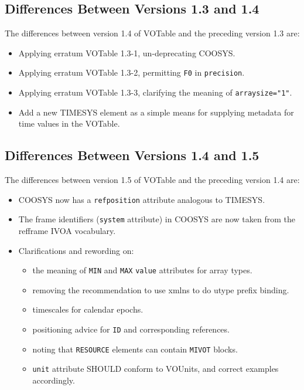 \documentclass[11pt,a4paper]{ivoa}
\let\fg=\color
\def\attr#1{{\tt{\fg{DarkRed}#1}}}
\def\elem#1{{\tt{\fg{DarkRed}#1}}}
\def\attrval#1#2{{\tt{\fg{DarkRed}#1}="{\fg{DarkPurple}#2}"}}
\begin{document}
{{{\subsection{Differences Between Versions 1.3 and 1.4}
\label{diff1.3-1.4}
The differences between version 1.4 of VOTable and the preceding
version 1.3 are:

\begin{itemize}
\item Applying erratum VOTable 1.3-1, un-deprecating COOSYS.
\item Applying erratum VOTable 1.3-2, permitting \verb|F0| in
\attr{precision}.
\item Applying erratum VOTable 1.3-3, clarifying the meaning of
\attrval{arraysize}{1}.
\item Add a new TIMESYS element as a simple means for
     supplying metadata for time values in the VOTable.
\end{itemize}


\subsection{Differences Between Versions 1.4 and 1.5}
\label{diff1.4-1.5}
The differences between version 1.5 of VOTable and the preceding
version 1.4 are:

\begin{itemize}
\item COOSYS now has a \attr{refposition} attribute analogous to TIMESYS.
\item The frame identifiers (\attr{system} attribute) in COOSYS are now taken
from the refframe IVOA vocabulary.
\item Clarifications and rewording on:
  \begin{itemize}
    \item the meaning of \elem{MIN} and \elem{MAX} \attr{value} attributes for
    array types.
    \item removing the recommendation to use xmlns to do utype prefix binding.
    \item timescales for calendar epochs.
    \item positioning advice for \attr{ID} and corresponding references.
    \item noting that \elem{RESOURCE} elements can contain \elem{MIVOT} blocks.
    \item \attr{unit} attribute SHOULD conform to VOUnits,
          and correct examples accordingly.
  \end{itemize}
\end{itemize}

}}}
\end{document}
